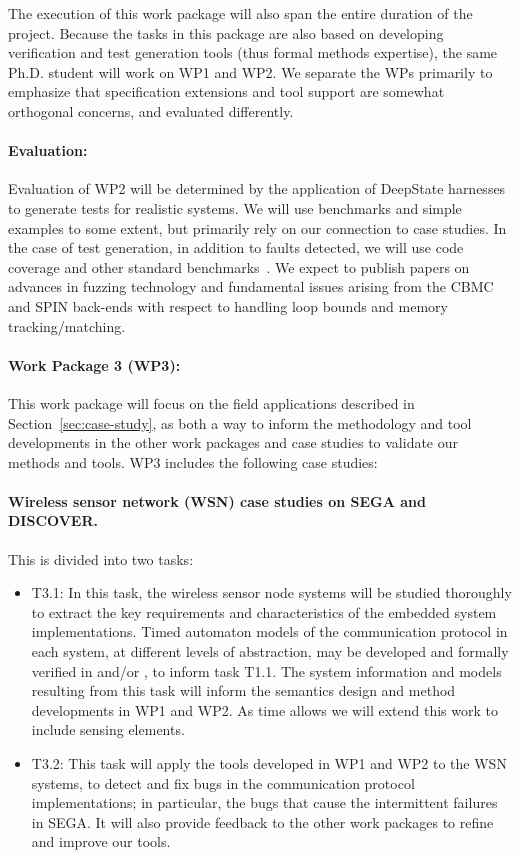 The execution of this work package will also span the entire duration of the project.
Because the tasks in this package are also based on developing
verification and test generation tools (thus formal methods
expertise), the same Ph.D. student will work on WP1 and WP2.  We
separate the WPs primarily to emphasize that specification extensions
and tool support are somewhat orthogonal concerns, and evaluated differently.

\paragraph{Evaluation:} Evaluation of
WP2 will be determined by the application
of DeepState harnesses to generate tests for realistic
systems.  We will use benchmarks and simple examples to some
extent, but primarily rely on our connection to case studies.
In the case of test generation, in addition to faults
detected, we will use code coverage and other standard
benchmarks~\cite{FuzzerHicks}.  We expect to publish papers on
advances in fuzzing technology and
fundamental issues arising from the CBMC and SPIN back-ends with
respect to handling loop bounds and memory tracking/matching.

\paragraph{Work Package 3 (WP3):}  This work package will focus on the field applications described in Section~\ref{sec:case-study}, as both a way to inform the methodology and tool developments in the other work packages and case studies %
to validate our methods and tools.
WP3 includes the following case studies:
\paragraph{Wireless sensor network (WSN) case studies on SEGA and DISCOVER.} This %
is divided into two tasks:
\noindent  \begin{itemize}[labelsep=3pt,leftmargin=12pt]
\item T3.1: In this task, the %
  wireless sensor node systems will be studied thoroughly to extract
  the key requirements and characteristics of the embedded system
  implementations.  Timed automaton models of the communication
  protocol in each system, at different levels of abstraction, may be
  developed and formally verified in \uppaal and/or \prism, to inform
  task T1.1.  The system information and models resulting from this
  task will inform the semantics design and method developments in WP1
  and WP2.  As time allows we will extend this work to include sensing
  elements.
\item T3.2: This task will apply the tools developed in WP1 and WP2 to
  the WSN systems, %
  to detect and fix bugs in
  the %
  communication protocol implementations; in particular, the bugs that
  cause the intermittent failures in
  SEGA. %
  It will also provide feedback to the other work packages to refine
  and improve our tools.
  \end{itemize}

